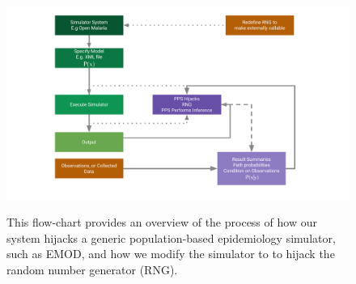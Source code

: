 \documentclass{article}
\begin{document}



 

\begin{figure}
  \includegraphics[width=\textwidth]{../plots/system.pdf}
  \label{fig:how}
  \caption{This flow-chart provides an overview of the process of how our system hijacks a generic population-based epidemiology simulator, such as EMOD, and how we modify the simulator to 
  to hijack the random number generator (RNG).}

  \end{figure}
\end{document}
